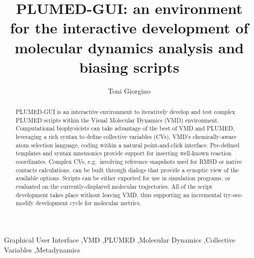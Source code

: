 \documentclass[preprint,review,11pt]{elsarticle}
\newcommand{\mytitle}{PLUMED-GUI: an environment for the interactive development 
  of molecular dynamics analysis and biasing scripts}
\newcommand{\mykeywords}{Graphical User Interface \sep VMD \sep PLUMED \sep Molecular Dynamics \sep Collective Variables \sep Metadynamics}
\begin{document}
\begin{frontmatter}


\title{\mytitle}
\author{Toni Giorgino}
\address{Institute of Biomedical Engineering (ISIB),\\ 
National Research Council of Italy (CNR),\\
Corso Stati Uniti 4, I-35127 Padua, Italy}




\begin{abstract}
  PLUMED-GUI is an interactive environment to iteratively develop and
  test complex PLUMED scripts within the Visual Molecular Dynamics
  (VMD) environment. Computational biophysicists can take advantage of
  the best of VMD and PLUMED, leveraging a rich syntax to define
  collective variables (CVs), VMD's chemically-aware atom selection
  language, coding within a natural point-and-click interface.
  Pre-defined templates and syntax mnemonics provide support for
  inserting well-known reaction coordinates. Complex CVs,
  e.g.\ involving reference snapshots used for RMSD or native contacts
  calculations, can be built through dialogs that provide a synoptic
  view of the available options.  Scripts can be either exported for
  use in simulation programs, or evaluated on the currently-displayed
  molecular trajectories. All of the script development takes place
  without leaving VMD, thus supporting an incremental try-see-modify
  development cycle for molecular metrics.
\end{abstract}


\begin{keyword}
\mykeywords
\end{keyword}

\end{frontmatter}
\end{document}
